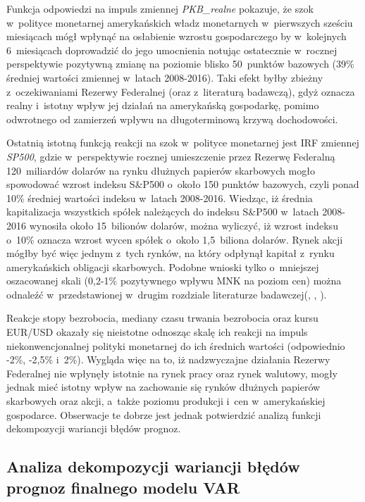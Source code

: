 Funkcja odpowiedzi na impuls zmiennej \textit{PKB_realne} pokazuje, że szok w~polityce monetarnej amerykańskich władz monetarnych w~pierwszych sześciu miesiącach mógł wpłynąć na osłabienie wzrostu gospodarczego by w~kolejnych 6~miesiącach doprowadzić do jego umocnienia notując ostatecznie w~rocznej perspektywie pozytywną zmianę na poziomie blisko 50~punktów bazowych (39\% średniej wartości zmiennej w~latach 2008-2016). Taki efekt byłby zbieżny z~oczekiwaniami Rezerwy Federalnej (oraz z~literaturą badawczą), gdyż oznacza realny i~istotny wpływ jej działań na amerykańską gospodarkę, pomimo odwrotnego od zamierzeń wpływu na długoterminową krzywą dochodowości.

Ostatnią istotną funkcją reakcji na szok w~polityce monetarnej jest \acs{IRF} zmiennej \textit{SP500}, gdzie w~perspektywie rocznej umieszczenie przez Rezerwę Federalną 120~miliardów dolarów na rynku dłużnych papierów skarbowych mogło spowodować wzrost indeksu S\&P500 o~około 150 punktów bazowych, czyli ponad 10\% średniej wartości indeksu w~latach 2008-2016. Wiedząc, iż średnia kapitalizacja wszystkich spółek należących do indeksu S\&P500 w~latach 2008-2016 wynosiła około 15~bilionów dolarów, można wyliczyć, iż wzrost indeksu o~10\% oznacza wzrost wycen spółek o~około 1,5~biliona dolarów. Rynek akcji mógłby być więc jednym z~tych rynków, na który odpłynął kapitał z~rynku amerykańskich obligacji skarbowych. Podobne wnioski tylko o~mniejszej oszacowanej skali (0,2-1\% pozytywnego wpływu \acs{MNK} na poziom cen) można odnaleźć w~przedstawionej w~drugim rozdziale literaturze badawczej(\cite{chen36}, \cite{bhattarai36}, \cite{swanson37}).

Reakcje stopy bezrobocia, mediany czasu trwania bezrobocia oraz kursu EUR/USD okazały się nieistotne odnosząc skalę ich reakcji na impuls niekonwencjonalnej polityki monetarnej do ich średnich wartości (odpowiednio -2\%, -2,5\% i~2\%). Wygląda więc na to, iż nadzwyczajne działania Rezerwy Federalnej nie wpłynęły istotnie na rynek pracy oraz rynek walutowy, mogły jednak mieć istotny wpływ na zachowanie się rynków dłużnych papierów skarbowych oraz akcji, a~także poziomu produkcji i~cen w~amerykańskiej gospodarce. Obserwacje te dobrze jest jednak potwierdzić analizą funkcji dekompozycji wariancji błędów prognoz.

\subsection*{\normalsize{Analiza dekompozycji wariancji błędów prognoz finalnego modelu VAR}}

